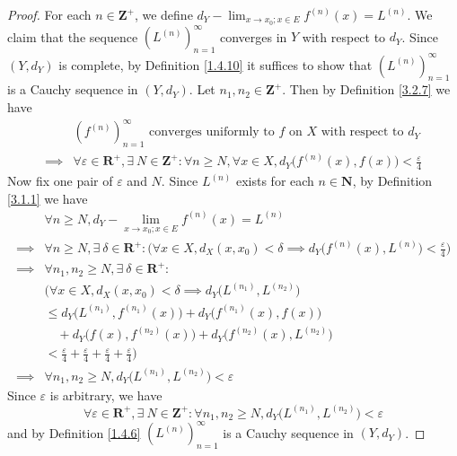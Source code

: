 \begin{proof}
    For each \(n \in \mathbf{Z}^+\), we define \(d_Y - \lim_{x \to x_0 ; x \in E} f^{(n)}(x) = L^{(n)}\).
    We claim that the sequence \((L^{(n)})_{n = 1}^\infty\) converges in \(Y\) with respect to \(d_Y\).
    Since \((Y, d_Y)\) is complete, by Definition \ref{1.4.10} it suffices to show that \((L^{(n)})_{n = 1}^\infty\) is a Cauchy sequence in \((Y, d_Y)\).
    Let \(n_1, n_2 \in \mathbf{Z}^+\).
    Then by Definition \ref{3.2.7} we have
    \begin{align*}
                 & (f^{(n)})_{n = 1}^\infty \text{ converges uniformly to } f \text{ on } X \text{ with respect to } d_Y                                                        \\
        \implies & \forall \varepsilon \in \mathbf{R}^+, \exists\ N \in \mathbf{Z}^+ : \forall n \geq N, \forall x \in X, d_Y\big(f^{(n)}(x), f(x)\big) < \frac{\varepsilon}{4}
    \end{align*}
    Now fix one pair of \(\varepsilon\) and \(N\).
    Since \(L^{(n)}\) exists for each \(n \in \mathbf{N}\), by Definition \ref{3.1.1} we have
    \begin{align*}
                 & \forall n \geq N, d_Y - \lim_{x \to x_0 ; x \in E} f^{(n)}(x) = L^{(n)}                                                                                                \\
        \implies & \forall n \geq N, \exists\ \delta \in \mathbf{R}^+ : \Big(\forall x \in X, d_X(x, x_0) < \delta \implies d_Y\big(f^{(n)}(x), L^{(n)}\big) < \frac{\varepsilon}{4}\Big) \\
        \implies & \forall n_1, n_2 \geq N, \exists\ \delta \in \mathbf{R}^+ :                                                                                                            \\
                 & \Big(\forall x \in X, d_X(x, x_0) < \delta \implies d_Y\big(L^{(n_1)}, L^{(n_2)}\big)                                                                                  \\
                 & \leq d_Y\big(L^{(n_1)}, f^{(n_1)}(x)\big) + d_Y\big(f^{(n_1)}(x), f(x)\big)                                                                                            \\
                 & \quad + d_Y\big(f(x), f^{(n_2)}(x)\big) + d_Y\big(f^{(n_2)}(x), L^{(n_2)}\big)                                                                                         \\
                 & < \frac{\varepsilon}{4} + \frac{\varepsilon}{4} + \frac{\varepsilon}{4} + \frac{\varepsilon}{4}\Big)                                                                   \\
        \implies & \forall n_1, n_2 \geq N, d_Y\big(L^{(n_1)}, L^{(n_2)}\big) < \varepsilon
    \end{align*}
    Since \(\varepsilon\) is arbitrary, we have
    \[
        \forall \varepsilon \in \mathbf{R}^+, \exists\ N \in \mathbf{Z}^+ : \forall n_1, n_2 \geq N, d_Y\big(L^{(n_1)}, L^{(n_2)}\big) < \varepsilon
    \]
    and by Definition \ref{1.4.6} \((L^{(n)})_{n = 1}^\infty\) is a Cauchy sequence in \((Y, d_Y)\).


\end{proof}
